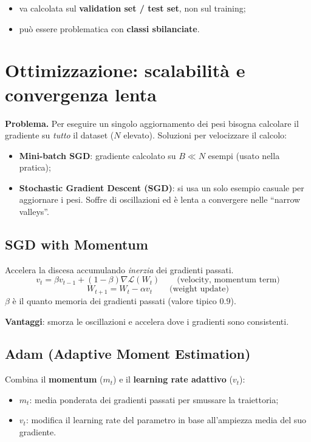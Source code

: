 \documentclass[11pt,a4paper]{article}
\begin{document}
\begin{osservazione}[Osservazioni]
\begin{itemize}
  \item va calcolata sul \textbf{validation set / test set}, non sul training;
  \item può essere problematica con \textbf{classi sbilanciate}.
\end{itemize}
\end{osservazione}

\section{Ottimizzazione: scalabilità e convergenza lenta}

\textbf{Problema.} Per eseguire un singolo aggiornamento dei pesi bisogna calcolare il gradiente su \emph{tutto} il dataset ($N$ elevato). Soluzioni per velocizzare il calcolo:
\begin{itemize}
  \item \textbf{Mini-batch SGD}: gradiente calcolato su $B \ll N$ esempi (usato nella pratica);
  \item \textbf{Stochastic Gradient Descent (SGD)}: si usa un solo esempio casuale per aggiornare i pesi. Soffre di oscillazioni ed è lenta a convergere nelle ``narrow valleys''.
\end{itemize}

\subsection{SGD with Momentum}
Accelera la discesa accumulando \emph{inerzia} dei gradienti passati.
\[
v_t = \beta v_{t-1} + (1-\beta)\nabla\mathcal{L}(W_t) \qquad \text{(velocity, momentum term)}
\]
\[
W_{t+1} = W_t - \alpha v_t \qquad \text{(weight update)}
\]
$\beta$ è il quanto memoria dei gradienti passati (valore tipico $0.9$).

\textbf{Vantaggi}: smorza le oscillazioni e accelera dove i gradienti sono consistenti.

\subsection{Adam (Adaptive Moment Estimation)}
Combina il \textbf{momentum} ($m_t$) e il \textbf{learning rate adattivo} ($v_t$):
\begin{itemize}
  \item $m_t$: media ponderata dei gradienti passati per smussare la traiettoria;
  \item $v_t$: modifica il learning rate del parametro in base all'ampiezza media del suo gradiente.
\end{itemize}
\end{document}
